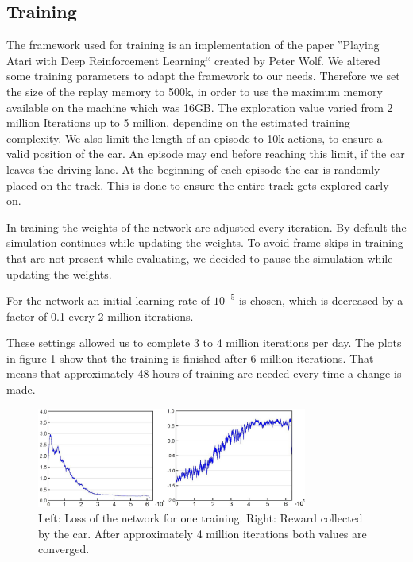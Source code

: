 
\subsection{Training}
The framework used for training is an implementation of the paper ''Playing Atari with Deep Reinforcement Learning``  created by Peter Wolf. We altered some training parameters to adapt the framework to our needs. Therefore we set the size of the replay memory to 500k, in order to use the maximum memory available on the machine which was 16GB. The exploration value varied from 2 million Iterations up to 5 million, depending on the estimated training complexity. We also limit the length of an episode to 10k actions, to ensure a valid position of the car. An episode may end before reaching this limit, if the car leaves the driving lane. At the beginning of each episode the car is randomly placed on the track. This is done to ensure the entire track gets explored early on.

In training the weights of the network are adjusted every iteration. By default the simulation continues while updating the weights. To avoid frame skips in training that are not present while evaluating, we decided to pause the simulation while updating the weights.

For the network an initial learning rate of $10^{-5}$ is chosen, which is decreased by a factor of 0.1 every 2 million iterations.

These settings allowed us to complete 3 to 4 million iterations per day. The plots in figure \ref{fig:lossandrew} show that the training is finished after 6 million iterations. That means that approximately 48 hours of training are needed every time a change is made.

\begin{figure}[!t]
\centering
\includegraphics[width=3.5in]{../presentation/both-plot.jpg} 
\caption{Left: Loss of the network for one training. Right: Reward collected by the car. After approximately 4 million iterations both values are converged.}
\label{fig:lossandrew}
\end{figure}
 
